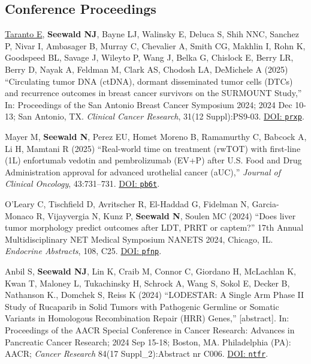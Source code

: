 \documentclass[letterpaper,11pt]{article} %
\begin{document}
 	\subsection*{Conference Proceedings}
 	\begin{etaremune}
            \item  \underline{Taranto E}, \textbf{Seewald NJ}, Bayne LJ, Walinsky E, Deluca S, Shih NNC, Sanchez P, Nivar I, Ambasager B, Murray C, Chevalier A, Smith CG, Makhlin I, Rohn K, Goodspeed BL, Savage J, Wileyto P, Wang J, Belka G, Chislock E, Berry LR, Berry D, Nayak A, Feldman M, Clark AS, Chodosh LA, DeMichele A (2025) ``Circulating tumor DNA (ctDNA), dormant disseminated tumor cells (DTCs) and recurrence outcomes in breast cancer survivors on the SURMOUNT Study,'' In: Proceedings of the San Antonio Breast Cancer Symposium 2024; 2024 Dec 10-13; San Antonio, TX. \textit{Clinical Cancer Research}, 31(12 Suppl):PS9-03. \href{https://doi.org/prxp}{DOI: \texttt{prxp}}.
        
            \item Mayer M, \textbf{Seewald N}, Perez EU, Homet Moreno B, Ramamurthy C, Babcock A, Li H, Mamtani R (2025) ``Real-world time on treatment (rwTOT) with first-line (1L) enfortumab vedotin and pembrolizumab (EV+P) after U.S. Food and Drug Administration approval for advanced urothelial cancer (aUC),'' \textit{Journal of Clinical Oncology}, 43:731–731. \href{https://doi.org/pb6t}{DOI: \texttt{pb6t}}.

            \item O'Leary C, Tischfield D, Avritscher R, El-Haddad G, Fidelman N, Garcia-Monaco R, Vijayvergia N, Kunz P, \textbf{Seewald N}, Soulen MC (2024) ``Does liver tumor morphology predict outcomes after LDT, PRRT or captem?'' 17th Annual Multidisciplinary NET Medical Symposium NANETS 2024, Chicago, IL. \textit{Endocrine Abstracts}, 108, C25. \href{https://doi.org/pfnp}{DOI: \texttt{pfnp}}.
    
            \item Anbil S, \textbf{Seewald NJ}, Lin K, Craib M, Connor C, Giordano H, McLachlan K, Kwan T, Maloney L, Tukachinsky H, Schrock A, Wang S, Sokol E, Decker B, Nathanson K., Domchek S, Reiss K (2024) ``LODESTAR: A Single Arm Phase II Study of Rucaparib in Solid Tumors with Pathogenic Germline or Somatic Variants in Homologous Recombination Repair (HRR) Genes,'' [abstract]. In: Proceedings of the AACR Special Conference in Cancer Research: Advances in Pancreatic Cancer Research; 2024 Sep 15-18; Boston, MA. Philadelphia (PA): AACR; \textit{Cancer Research} 84(17 Suppl\_2):Abstract nr C006. \href{https://doi.org/ntfr}{DOI: \texttt{ntfr}}.


\end{etaremune}
\end{document}

